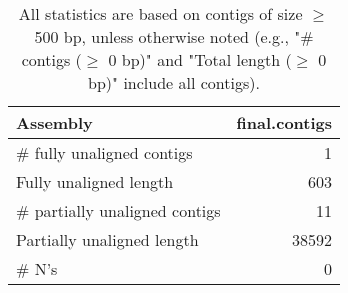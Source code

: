 \documentclass[12pt,a4paper]{article}
\begin{document}
\begin{table}[ht]
\begin{center}
\caption{All statistics are based on contigs of size $\geq$ 500 bp, unless otherwise noted (e.g., "\# contigs ($\geq$ 0 bp)" and "Total length ($\geq$ 0 bp)" include all contigs).}
\begin{tabular}{|l*{1}{|r}|}
\hline
Assembly & final.contigs \\ \hline
\# fully unaligned contigs & 1 \\ \hline
Fully unaligned length & 603 \\ \hline
\# partially unaligned contigs & 11 \\ \hline
Partially unaligned length & 38592 \\ \hline
\# N's & 0 \\ \hline
\end{tabular}
\end{center}
\end{table}
\end{document}
